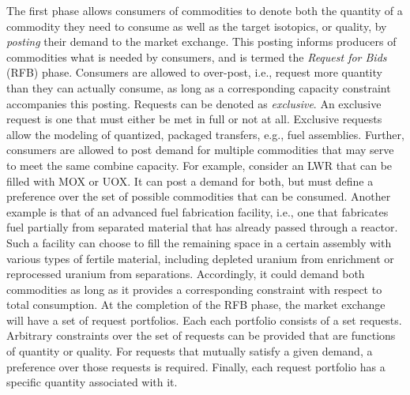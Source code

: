 The first phase allows consumers of commodities to denote both the quantity of a
commodity they need to consume as well as the target isotopics, or quality, by
\textit{posting} their demand to the market exchange. This posting informs
producers of commodities what is needed by consumers, and is termed the
\textit{Request for Bids} (RFB) phase. Consumers are allowed to over-post, i.e.,
request more quantity than they can actually consume, as long as a corresponding
capacity constraint accompanies this posting. Requests can be denoted as
\textit{exclusive}. An exclusive request is one that must either be met in full
or not at all. Exclusive requests allow the modeling of quantized, packaged
transfers, e.g., fuel assemblies. Further, consumers are allowed to post demand
for multiple commodities that may serve to meet the same combine capacity. For
example, consider an LWR that can be filled with MOX or UOX. It can post a
demand for both, but must define a preference over the set of possible
commodities that can be consumed. Another example is that of an advanced fuel
fabrication facility, i.e., one that fabricates fuel partially from separated
material that has already passed through a reactor. Such a facility can choose
to fill the remaining space in a certain assembly with various types of fertile
material, including depleted uranium from enrichment or reprocessed uranium from
separations. Accordingly, it could demand both commodities as long as it
provides a corresponding constraint with respect to total consumption. At the
completion of the RFB phase, the market exchange will have a set of request
portfolios. Each each portfolio consists of a set requests. Arbitrary
constraints over the set of requests can be provided that are functions of
quantity or quality.  For requests that mutually satisfy a given demand, a
preference over those requests is required. Finally, each request portfolio has
a specific quantity associated with it. 

